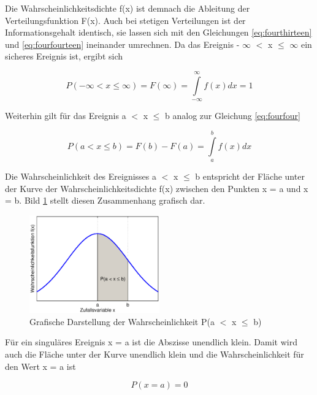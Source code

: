 \noindent Die Wahrscheinlichkeitsdichte f(x) ist demnach die Ableitung der Verteilungsfunktion F(x). Auch bei stetigen Verteilungen ist der Informationsgehalt identisch, sie lassen sich mit den Gleichungen \eqref{eq:fourthirteen} und \eqref{eq:fourfourteen} ineinander umrechnen. Da das Ereignis - $\infty$ $\mathrm{<}$ x $\leq$ $\infty$ ein sicheres Ereignis ist, ergibt sich

\begin{equation}\label{eq:fourfifteen}
P\left(-\infty <x\le \infty \right)=F(\infty)=\int\limits _{-\infty }^{\infty }f(x)dx =1
\end{equation}

\noindent Weiterhin gilt f\"{u}r das Ereignis a $\mathrm{<}$ x $\leq$ b analog zur Gleichung \eqref{eq:fourfour}

\begin{equation}\label{eq:foursixteen}
P\left(a<x\le b\right)=F(b)-F(a)=\int\limits _{a}^{b}f(x)dx
\end{equation}

\noindent Die Wahrscheinlichkeit des Ereignisses a $\mathrm{<}$ x $\leq$ b entspricht der Fl\"{a}che unter der Kurve der Wahrscheinlichkeitsdichte f(x) zwischen den Punkten x = a und x = b. Bild \ref{fig:WahrscheinlichkeitVariableIntervall} stellt diesen Zusammenhang grafisch dar. 

\noindent 
\begin{figure}[H]
  \centerline{\includegraphics[width=0.5\textwidth]{Kapitel4/Bilder/image2}}
  \caption{Grafische Darstellung der Wahrscheinlichkeit P(a $\mathrm{<}$ x $\mathrm{\le}$ b)}
  \label{fig:WahrscheinlichkeitVariableIntervall}
\end{figure}

\clearpage 

\noindent F\"{u}r ein singul\"{a}res Ereignis x = a ist die Abszisse unendlich klein. Damit wird auch die Fl\"{a}che unter der Kurve unendlich klein und die Wahrscheinlichkeit f\"{u}r den Wert x = a ist 

\begin{equation}\label{eq:fourseventeen}
P(x=a)=0
\end{equation}

